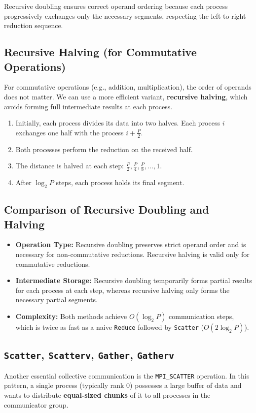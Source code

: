 \documentclass[12pt]{book}
\begin{document}
Recursive doubling ensures correct operand ordering because each process progressively exchanges only the necessary segments, respecting the left-to-right reduction sequence.

\subsection*{Recursive Halving (for Commutative Operations)}
For commutative operations (e.g., addition, multiplication), the order of operands does not matter. We can use a more efficient variant, \textbf{recursive halving}, which avoids forming full intermediate results at each process.

\begin{enumerate}
    \item Initially, each process divides its data into two halves. Each process $i$ exchanges one half with the process $i+\frac{P}{2}$.
    \item Both processes perform the reduction on the received half.
    \item The distance is halved at each step: $\frac{P}{2},\frac{P}{4},\frac{P}{8},\ldots,1$.
    \item After $\log_2 P$ steps, each process holds its final segment.
\end{enumerate}

\subsection*{Comparison of Recursive Doubling and Halving}
\begin{itemize}
    \item \textbf{Operation Type:} Recursive doubling preserves strict operand order and is necessary for non-commutative reductions. Recursive halving is valid only for commutative reductions.
    \item \textbf{Intermediate Storage:} Recursive doubling temporarily forms partial results for each process at each step, whereas recursive halving only forms the necessary partial segments.
    \item \textbf{Complexity:} Both methods achieve $O(\log_2 P)$ communication steps, which is twice as fast as a naive \texttt{Reduce} followed by \texttt{Scatter} ($O(2\log_2 P)$).
\end{itemize}



\subsection{\texttt{Scatter}, \texttt{Scatterv}, \texttt{Gather}, \texttt{Gatherv}}
Another essential collective communication is the \texttt{MPI\_SCATTER} operation. In this pattern, a single process (typically rank 0) possesses a large buffer of data and wants to distribute \textbf{equal-sized chunks} of it to all processes in the communicator group.
\end{document}
